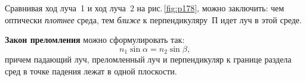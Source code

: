 \documentclass[main.tex]{subfiles}
\begin{document}
Сравнивая ход луча~1 и ход луча~2 на рис.\,\ref{fig:p178}, можно заключить: чем оптически \emph{плотнее} среда, тем \emph{ближе} к перпендикуляру~П идет луч в этой среде. 

\textbf{Закон преломления} можно сформулировать так:
    \begin{equation}
        \label{3refr_e1}
        n_1\sin\alpha=n_2\sin\beta,
    \end{equation}
причем падающий луч, преломленный луч и перпендикуляр к границе раздела сред в точке падения лежат в одной плоскости.


























 
\end{document}
